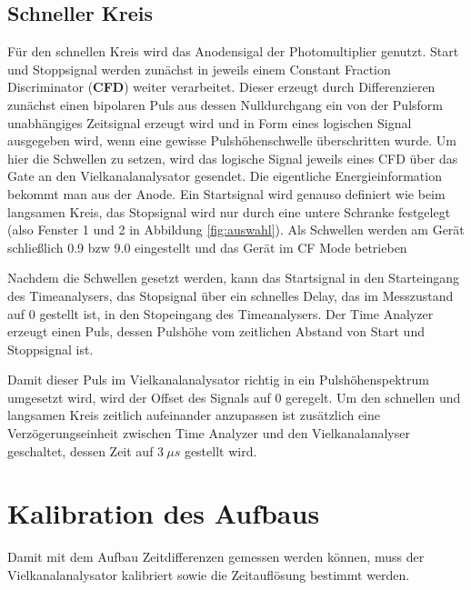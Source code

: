 \documentclass[a4paper,12pt]{article}
\begin{document}
\subsection*{Schneller Kreis}
Für den schnellen Kreis wird das Anodensigal der Photomultiplier genutzt.
Start und Stoppsignal werden zunächst in jeweils einem Constant
Fraction Discriminator (\textbf{CFD}) weiter verarbeitet.
Dieser erzeugt durch Differenzieren zunächst einen bipolaren Puls aus dessen Nulldurchgang ein von der Pulsform unabhängiges Zeitsignal erzeugt wird
und in Form eines logischen Signal ausgegeben wird, wenn eine gewisse Pulshöhenschwelle überschritten wurde.
Um hier die Schwellen zu setzen, wird das logische Signal jeweils eines CFD über das Gate an den Vielkanalanalysator gesendet.
Die eigentliche Energieinformation bekommt man aus der Anode.
Ein Startsignal wird genauso definiert wie beim langsamen Kreis, das Stopsignal wird nur durch eine untere Schranke festgelegt (also Fenster 1 und 2 in Abbildung \ref{fig:auswahl}).
Als Schwellen werden am Gerät schließlich 0.9 bzw 9.0 eingestellt und das Gerät im CF Mode betrieben

Nachdem die Schwellen gesetzt werden, kann das Startsignal in den Starteingang des Timeanalysers, das Stopsignal über ein schnelles Delay, das im Messzustand auf 0 gestellt ist, in den Stopeingang des Timeanalysers.
Der Time Analyzer erzeugt einen Puls, dessen Pulshöhe vom zeitlichen Abstand von Start und Stoppsignal ist.

Damit dieser Puls im Vielkanalanalysator richtig in ein Pulshöhenspektrum umgesetzt wird, wird der
Offset des Signals auf $0$ geregelt.
Um den schnellen und langsamen Kreis zeitlich aufeinander 
anzupassen ist zusätzlich eine Verzögerungseinheit zwischen Time Analyzer und den Vielkanalanalyser geschaltet, dessen Zeit auf $\SI{3}{μs}$ gestellt wird.

\section{Kalibration des Aufbaus}
Damit mit dem Aufbau Zeitdifferenzen gemessen werden können, muss der Vielkanalanalysator kalibriert
sowie die Zeitauflösung bestimmt werden.
\end{document}
